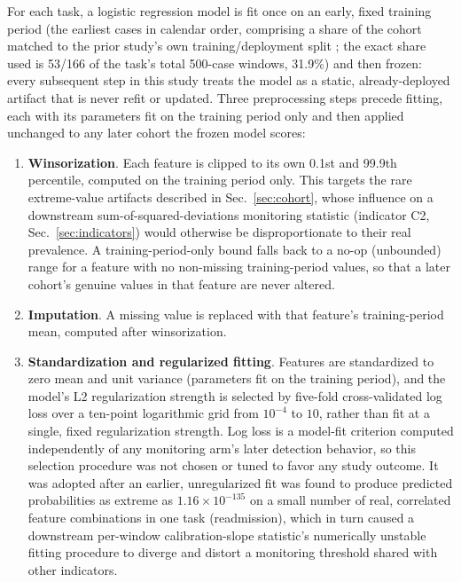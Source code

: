 \documentclass[preprintsapa,article,submit,oneauthor]{Definitions/mdpi}
\begin{document}
For each task, a logistic regression model is fit once on an early, fixed training period (the earliest cases in calendar order, comprising a share of the cohort matched to the prior study's own training/deployment split \citep{yu2026deferral}; the exact share used is 53/166 of the task's total 500-case windows, 31.9\%) and then frozen: every subsequent step in this study treats the model as a static, already-deployed artifact that is never refit or updated. Three preprocessing steps precede fitting, each with its parameters fit on the training period only and then applied unchanged to any later cohort the frozen model scores:

\begin{enumerate}
\item \textbf{Winsorization}. Each feature is clipped to its own 0.1st and 99.9th percentile, computed on the training period only. This targets the rare extreme-value artifacts described in Sec.~\ref{sec:cohort}, whose influence on a downstream sum-of-squared-deviations monitoring statistic (indicator C2, Sec.~\ref{sec:indicators}) would otherwise be disproportionate to their real prevalence. A training-period-only bound falls back to a no-op (unbounded) range for a feature with no non-missing training-period values, so that a later cohort's genuine values in that feature are never altered.
\item \textbf{Imputation}. A missing value is replaced with that feature's training-period mean, computed after winsorization.
\item \textbf{Standardization and regularized fitting}. Features are standardized to zero mean and unit variance (parameters fit on the training period), and the model's L2 regularization strength is selected by five-fold cross-validated log loss over a ten-point logarithmic grid from $10^{-4}$ to $10$, rather than fit at a single, fixed regularization strength. Log loss is a model-fit criterion computed independently of any monitoring arm's later detection behavior, so this selection procedure was not chosen or tuned to favor any study outcome. It was adopted after an earlier, unregularized fit was found to produce predicted probabilities as extreme as $1.16\times10^{-135}$ on a small number of real, correlated feature combinations in one task (readmission), which in turn caused a downstream per-window calibration-slope statistic's numerically unstable fitting procedure to diverge and distort a monitoring threshold shared with other indicators.
\end{enumerate}
\end{document}
